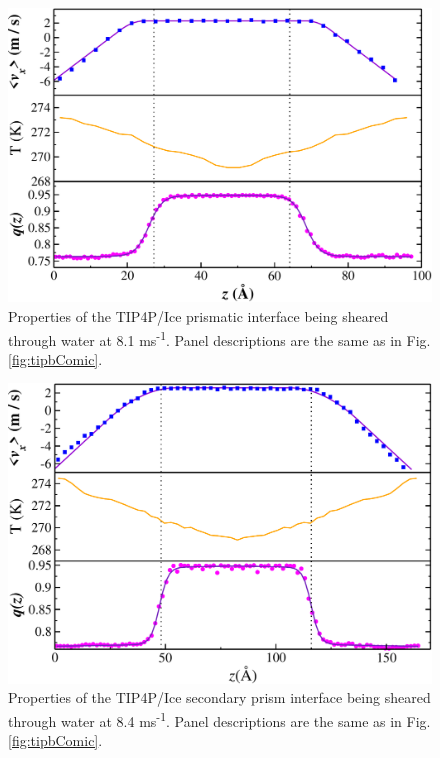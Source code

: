 \begin{figure}
\includegraphics[width=\linewidth]{Figures/Pyra_TIP4PIce_Plot}
\caption{\label{fig:tippyComic} Properties of the TIP4P/Ice prismatic
  interface being sheared through water at 8.1 ms\textsuperscript{-1}.
  Panel descriptions are the same as in Fig. \ref{fig:tipbComic}.}
\end{figure}

\begin{figure}
\includegraphics[width=\linewidth]{Figures/SecPrism_TIP4PIce_Plot}
\caption{\label{fig:tipsComic} Properties of the TIP4P/Ice secondary
  prism interface being sheared through water at 8.4
  ms\textsuperscript{-1}.  Panel descriptions are the same as in
  Fig. \ref{fig:tipbComic}.}
\end{figure}

